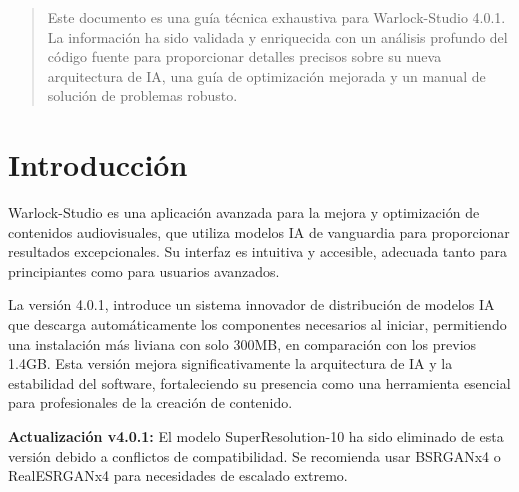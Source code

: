 \documentclass[11pt, a4paper]{article}
\begin{document}
\pagestyle{fancy} %

\begin{abstract}
\noindent %
Este documento es una guía técnica exhaustiva para Warlock-Studio 4.0.1. La información ha sido validada y enriquecida con un análisis profundo del código fuente para proporcionar detalles precisos sobre su nueva arquitectura de IA, una guía de optimización mejorada y un manual de solución de problemas robusto.
\end{abstract}

\newpage %
\tableofcontents %
\newpage %



\section{Introducción}
Warlock-Studio es una aplicación avanzada para la mejora y optimización de contenidos audiovisuales, que utiliza modelos IA de vanguardia para proporcionar resultados excepcionales. Su interfaz es intuitiva y accesible, adecuada tanto para principiantes como para usuarios avanzados.

La versión 4.0.1, introduce un sistema innovador de distribución de modelos IA que descarga automáticamente los componentes necesarios al iniciar, permitiendo una instalación más liviana con solo 300MB, en comparación con los previos 1.4GB. Esta versión mejora significativamente la arquitectura de IA y la estabilidad del software, fortaleciendo su presencia como una herramienta esencial para profesionales de la creación de contenido.

\textbf{Actualización v4.0.1:} El modelo SuperResolution-10 ha sido eliminado de esta versión debido a conflictos de compatibilidad. Se recomienda usar BSRGANx4 o RealESRGANx4 para necesidades de escalado extremo.
\end{document}

